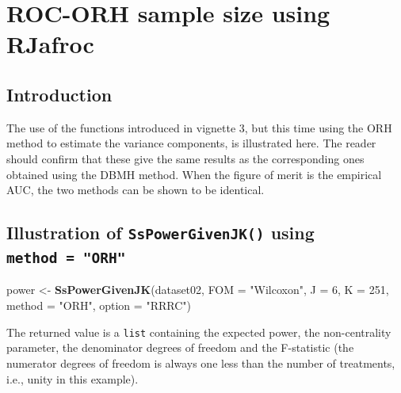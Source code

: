 \documentclass[
]{book}
\newenvironment{Shaded}{\begin{snugshade}}{\end{snugshade}}
\newcommand{\CommentTok}[1]{\textcolor[rgb]{0.56,0.35,0.01}{\textit{#1}}}
\newcommand{\DataTypeTok}[1]{\textcolor[rgb]{0.13,0.29,0.53}{#1}}
\newcommand{\DecValTok}[1]{\textcolor[rgb]{0.00,0.00,0.81}{#1}}
\newcommand{\KeywordTok}[1]{\textcolor[rgb]{0.13,0.29,0.53}{\textbf{#1}}}
\newcommand{\NormalTok}[1]{#1}
\newcommand{\StringTok}[1]{\textcolor[rgb]{0.31,0.60,0.02}{#1}}
\begin{document}
\hypertarget{SSRocORHRJafroc}{%
\chapter{ROC-ORH sample size using RJafroc}\label{SSRocORHRJafroc}}

\hypertarget{introduction-9}{%
\section{Introduction}\label{introduction-9}}

The use of the functions introduced in vignette 3, but this time using the ORH method to estimate the variance components, is illustrated here. The reader should confirm that these give the same results as the corresponding ones obtained using the DBMH method. When the figure of merit is the empirical AUC, the two methods can be shown to be identical.

\hypertarget{illustration-of-sspowergivenjk-using-method-orh}{%
\section{\texorpdfstring{Illustration of \texttt{SsPowerGivenJK()} using \texttt{method\ =\ "ORH"}}{Illustration of SsPowerGivenJK() using method = "ORH"}}\label{illustration-of-sspowergivenjk-using-method-orh}}

\begin{Shaded}
\begin{Highlighting}[]
\NormalTok{power \textless{}{-}}\StringTok{ }\KeywordTok{SsPowerGivenJK}\NormalTok{(dataset02, }\DataTypeTok{FOM =} \StringTok{"Wilcoxon"}\NormalTok{, }\DataTypeTok{J =} \DecValTok{6}\NormalTok{, }\DataTypeTok{K =} \DecValTok{251}\NormalTok{, }\DataTypeTok{method =} \StringTok{"ORH"}\NormalTok{, }\DataTypeTok{option =} \StringTok{"RRRC"}\NormalTok{)}
\end{Highlighting}
\end{Shaded}

The returned value is a \texttt{list} containing the expected power, the non-centrality parameter, the denominator degrees of freedom and the F-statistic (the numerator degrees of freedom is always one less than the number of treatments, i.e., unity in this example).

\begin{Shaded}
\end{Shaded}
\end{document}
